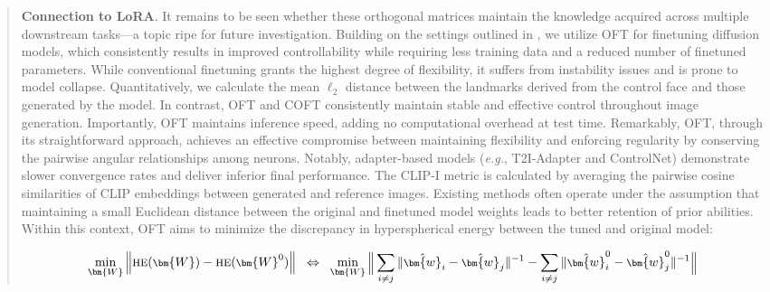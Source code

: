 \begin{itemize}[leftmargin=*,nosep]
\begin{abstract}
\textbf{Connection to LoRA}. It remains to be seen whether these orthogonal matrices maintain the knowledge acquired across multiple downstream tasks—a topic ripe for future investigation. Building on the settings outlined in \cite{zhang2023adding,mou2023t2i}, we utilize OFT for finetuning diffusion models, which consistently results in improved controllability while requiring less training data and a reduced number of finetuned parameters. While conventional finetuning grants the highest degree of flexibility, it suffers from instability issues and is prone to model collapse. Quantitatively, we calculate the mean $\ell_2$ distance between the landmarks derived from the control face and those generated by the model. In contrast, OFT and COFT consistently maintain stable and effective control throughout image generation. Importantly, OFT maintains inference speed, adding no computational overhead at test time. Remarkably, OFT, through its straightforward approach, achieves an effective compromise between maintaining flexibility and enforcing regularity by conserving the pairwise angular relationships among neurons. Notably, adapter-based models (\emph{e.g.}, T2I-Adapter and ControlNet) demonstrate slower convergence rates and deliver inferior final performance. The CLIP-I metric is calculated by averaging the pairwise cosine similarities of CLIP embeddings between generated and reference images. Existing methods often operate under the assumption that maintaining a small Euclidean distance between the original and finetuned model weights leads to better retention of prior abilities. Within this context, OFT aims to minimize the discrepancy in hyperspherical energy between the tuned and original model:

\begin{equation}\label{eq:oft_principle}
\footnotesize
\min_{\bm{W}} \left\| \text{HE}(\bm{W})-\text{HE}(\bm{W}^0)\right\|~~\Leftrightarrow~~\min_{\bm{W}} \bigg{\|} \sum_{i\neq j} \|\hat{\bm{w}}_i-\hat{\bm{w}}_j\|^{-1}-\sum_{i\neq j} \|\hat{\bm{w}}^0_i-\hat{\bm{w}}^0_j\|^{-1}\bigg{\|}
\end{equation}


\end{abstract}
\end{itemize}
